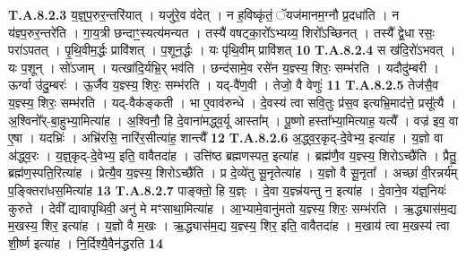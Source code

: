 \documentclass[17pt]{extarticle}
\begin{document}
                  \newline
                                                                  \textbf{ T.A.8.2.3} \newline
                  य॒ज्ञ्॒प॒रुर॒न्तरि॑यात् । यजु॑रे॒व व॑देत् ।  न ह॒विष्कृ॑तं॒ ॅयज॑मानम॒ग्नौ प्र॒दधा॑ति । न य॑ज्ञ्प॒रुर॒न्तरे॑ति । गा॒य॒त्री छन्दाꣳ॒॒स्यत्य॑मन्यत ।  तस्यै॑ वषट्का॒रो᳚ऽभ्यय्य॒ शिरो᳚ऽच्छिनत् ।  तस्यै᳚ द्वे॒धा रसः॒ परा॑ऽपतत् । पृ॒थि॒वीम॒र्द्धः प्रावि॑शत् । प॒शून॒र्द्धः । यः पृ॑थि॒वीम् प्रावि॑शत् \textbf{ 10} \newline
                  \newline
                                                                  \textbf{ T.A.8.2.4} \newline
                  स ख॑दि॒रो॑ऽभवत् । यः प॒शून् । सो॑ऽजाम् । यत्खा॑दि॒र्यभ्रि॒र् भव॑ति । छन्द॑सामे॒व रसे॑न य॒ज्ञ्स्य॒ शिरः॒ सम्भ॑रति । यदौदु॑म्बरी ।  ऊर्ग्वा उ॑दु॒म्बरः॑ । ऊ॒र्जैव य॒ज्ञ्स्य॒ शिरः॒ सम्भ॑रति । यद्-वै॑ण॒वी । तेजो॒ वै वेणुः॑ \textbf{ 11} \newline
                  \newline
                                                                  \textbf{ T.A.8.2.5} \newline
                  तेज॑सै॒व य॒ज्ञ्स्य॒ शिरः॒ सम्भ॑रति । यद्-वैक॑ङ्कती ।  भा ए॒वाव॑रुन्धे । दे॒वस्य॑ त्वा सवि॒तुः प्र॑स॒व इत्यभ्रि॒माद॑त्ते॒ प्रसू᳚त्यै । अ॒श्विनो᳚र्-बा॒हुभ्या॒मित्या॑ह । अ॒श्विनौ॒ हि दे॒वाना॑मद्ध्व॒र्यू आस्ता᳚म् ।  पू॒ष्णो हस्ता᳚भ्या॒मित्याह॒ यत्यै᳚ । वज्र॑ इव॒ वा ए॒षा । यदभ्रिः॑ । अभ्रि॑रसि॒ नारि॑र॒सीत्या॑ह॒ शान्त्यै᳚ \textbf{ 12} \newline
                  \newline
                                                                  \textbf{ T.A.8.2.6} \newline
                  अ॒द्ध्व॒र॒कृद्-दे॒वेभ्य॒ इत्या॑ह । य॒ज्ञो वा अ॑द्ध्व॒रः । य॒ज्ञ्॒कृद्-दे॒वेभ्य॒ इति॒ वावैतदा॑ह । उत्ति॑ष्ठ ब्रह्मणस्पत॒ इत्या॑ह ।  ब्रह्म॑णै॒व य॒ज्ञ्स्य॒ शिरोऽच्छै॑ति ।  प्रैतु॒ ब्रह्म॑ण॒स्पति॒रित्या॑ह । प्रेत्यै॒व य॒ज्ञ्स्य॒ शिरोऽच्छै॑ति । प्र दे॒व्ये॑तु सू॒नृतेत्या॑ह ।  य॒ज्ञो वै सू॒नृता᳚ । अच्छा॑ वी॒रन्नर्य॑म् प॒ङ्क्तिरा॑धस॒मित्या॑ह \textbf{ 13} \newline
                  \newline
                                                                  \textbf{ T.A.8.2.7} \newline
                  पाङ्क्तो॒ हि य॒ज्ञ्ः । दे॒वा य॒ज्ञ्न्न॑यन्तु न॒ इत्या॑ह ।  दे॒वाने॒व य॑ज्ञ्॒नियः॑ कुरुते । देवी᳚ द्यावापृथिवी॒ अनु॑ मे मꣳसाथा॒मित्या॑ह । आ॒भ्यामे॒वानु॑मतो य॒ज्ञ्स्य॒ शिरः॒ सम्भ॑रति । ऋ॒द्ध्यास॑म॒द्य म॒खस्य॒ शिर॒ इत्या॑ह । य॒ज्ञो वै म॒खः ।  ऋ॒द्ध्यास॑म॒द्य य॒ज्ञ्स्य॒ शिर॒ इति॒ वावैतदा॑ह ।  म॒खाय॑ त्वा म॒खस्य॑ त्वा शी॒र्ष्ण इत्या॑ह ।  नि॒र्दिश्यै॒वैन॑द्धरति \textbf{ 14} \newline
\end{document}
